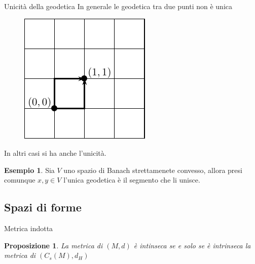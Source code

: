 \documentclass{beamer}
\newcounter{counter1}
\theoremstyle{plain}
\newtheorem{mypro}[counter1]{Proposizione}
\theoremstyle{definition}
\newtheorem{myes}[counter1]{Esempio}
\theoremstyle{remark}
\newcommand{\obar}[1]{\overline{#1}}
\newcommand{\set}[1]{\left\{#1\right\}}
\newcommand{\bra}[1]{\left[#1\right]}
\newcommand{\abs}[1]{\left|#1\right|}
\DeclareMathOperator{\len}{len}
\begin{document}
\begin{frame}{Unicità della geodetica}
  In generale le geodetica tra due punti non è unica
  \begin{figure}[h]
    \includegraphics[scale=0.4]{griglia.pdf}
  \end{figure}
  In altri casi si ha anche l'unicità.
  \begin{myes}
    Sia $V$ uno spazio di Banach strettamenete convesso, allora presi
    comunque $x,y \in V$ l'unica geodetica è il segmento che li unisce.
  \end{myes}
\end{frame}

\subsection{Spazi di forme}

\begin{frame}{Metrica indotta}
  \begin{mypro}
    La metrica di $(M,d)$ è intinseca se e solo se è intrinseca la
    metrica di $(C_s(M),d_H)$
  \end{mypro}
\end{frame}



\end{document}
